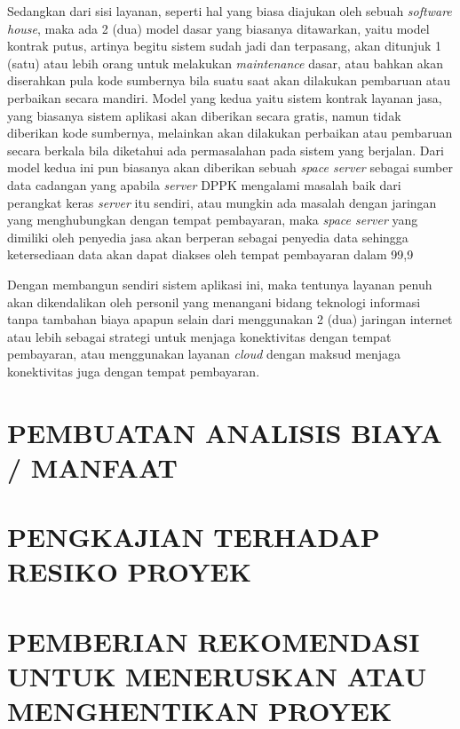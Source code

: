 \documentclass[pdftex, 12pt, oneside]{article}
\begin{document}
Sedangkan dari sisi layanan, seperti hal yang biasa diajukan oleh sebuah \textit{software house}, maka ada 2 (dua) model dasar yang biasanya ditawarkan, yaitu model kontrak putus, artinya begitu sistem sudah jadi dan terpasang, akan ditunjuk 1 (satu) atau lebih orang untuk melakukan \textit{maintenance} dasar, atau bahkan akan diserahkan pula kode sumbernya bila suatu saat akan dilakukan pembaruan atau perbaikan secara mandiri. Model yang kedua yaitu sistem kontrak layanan jasa, yang biasanya sistem aplikasi akan diberikan secara gratis, namun tidak diberikan kode sumbernya, melainkan akan dilakukan perbaikan atau pembaruan secara berkala bila diketahui ada permasalahan pada sistem yang berjalan. Dari model kedua ini pun biasanya akan diberikan sebuah \textit{space server} sebagai sumber data cadangan yang apabila \textit{server} DPPK mengalami masalah baik dari perangkat keras \textit{server} itu sendiri, atau mungkin ada masalah dengan jaringan yang menghubungkan dengan tempat pembayaran, maka \textit{space server} yang dimiliki oleh penyedia jasa akan berperan sebagai penyedia data sehingga ketersediaan data akan dapat diakses oleh tempat pembayaran dalam 99,9%

Dengan membangun sendiri sistem aplikasi ini, maka tentunya layanan penuh akan dikendalikan oleh personil yang menangani bidang teknologi informasi tanpa tambahan biaya apapun selain dari menggunakan 2 (dua) jaringan internet atau lebih sebagai strategi untuk menjaga konektivitas dengan tempat pembayaran, atau menggunakan layanan \textit{cloud} dengan maksud menjaga konektivitas juga dengan tempat pembayaran.


\section{PEMBUATAN ANALISIS BIAYA / MANFAAT}


\section{PENGKAJIAN TERHADAP RESIKO PROYEK}


\section{PEMBERIAN REKOMENDASI UNTUK MENERUSKAN ATAU MENGHENTIKAN PROYEK}
\end{document}
